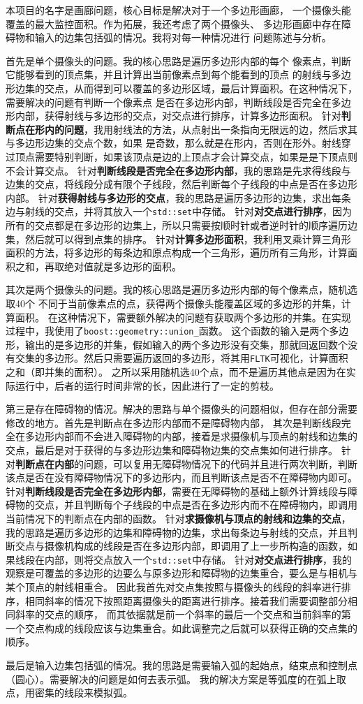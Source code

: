 本项目的名字是画廊问题，核心目标是解决对于一个多边形画廊，
一个摄像头能覆盖的最大监控面积。作为拓展，我还考虑了两个摄像头、
多边形画廊中存在障碍物和输入的边集包括弧的情况。我将对每一种情况进行
问题陈述与分析。

首先是单个摄像头的问题。我的核心思路是遍历多边形内部的每个
像素点，判断它能够看到的顶点集，并且计算出当前像素点到每个能看到的顶点
的射线与多边形边集的交点，从而得到可以覆盖的多边形区域，最后计算面积。在这种情况下，需要解决的问题有判断一个像素点
是否在多边形内部，判断线段是否完全在多边形内部，获得射线与多边形的交点，对交点进行排序，计算多边形面积。
针对\textbf{判断点在形内的问题}，我用射线法的方法，从点射出一条指向无限远的边，然后求其与多边形边集的交点个数，如果
是奇数，那么就是在形内，否则在形外。射线穿过顶点需要特别判断，如果该顶点是边的上顶点才会计算交点，如果是是下顶点则不会计算交点。
针对\textbf{判断线段是否完全在多边形内部}，我的思路是先求得线段与边集的交点，将线段分成有限个子线段，然后判断每个子线段的中点是否在多边形内部。
针对\textbf{获得射线与多边形的交点}，我的思路是遍历多边形的边集，求出每条边与射线的交点，并将其放入一个\texttt{std::set}中存储。
针对\textbf{对交点进行排序}，因为所有的交点都是在多边形的边集上，所以只需要按顺时针或者逆时针的顺序遍历边集，然后就可以得到点集的排序。
针对\textbf{计算多边形面积}，我利用叉乘计算三角形面积的方法，将多边形的每条边和原点构成一个三角形，遍历所有三角形，计算面积之和，再取绝对值就是多边形的面积。

其次是两个摄像头的问题。我的核心思路是遍历多边形内部的每个像素点，随机选取40个
不同于当前像素点的点，获得两个摄像头能覆盖区域的多边形的并集，计算面积。
在这种情况下，需要额外解决的问题有获取两个多边形的并集。在实现过程中，我使用了\texttt{boost::geometry::union_}函数。
这个函数的输入是两个多边形，输出的是多边形的并集，假如输入的两个多边形没有交集，那就回返回数个没有交集的多边形。然后只需要遍历返回的多边形，将其用\texttt{FLTK}可视化，计算面积之和（即并集的面积）。
之所以采用随机选40个点，而不是遍历其他点是因为在实际运行中，后者的运行时间非常的长，因此进行了一定的剪枝。

第三是存在障碍物的情况。解决的思路与单个摄像头的问题相似，但存在部分需要修改的地方。首先是判断点在多边形内部而不是障碍物内部，
其次是判断线段完全在多边形内部而不会进入障碍物的内部，接着是求摄像机与顶点的射线和边集的交点，最后是对于获得的与多边形边集和障碍物边集的交点集如何进行排序。
针对\textbf{判断点在内部}的问题，可以复用无障碍物情况下的代码并且进行两次判断，判断该点是否在没有障碍物情况下的多边形内，而且判断该点是否不在障碍物内即可。
针对\textbf{判断线段是否完全在多边形内部}，需要在无障碍物的基础上额外计算线段与障碍物的交点，并且判断每个子线段的中点是否在多边形内而不在障碍物内，即调用当前情况下的判断点在内部的函数。
针对\textbf{求摄像机与顶点的射线和边集的交点}，我的思路是遍历多边形的边集和障碍物的边集，求出每条边与射线的交点，并且判断交点与摄像机构成的线段是否在多边形内部，即调用了上一步所构造的函数，如果线段在内部，则将交点放入一个\texttt{std::set}中存储。
针对\textbf{对交点进行排序}，我的观察是可覆盖的多边形的边要么与原多边形和障碍物的边集重合，要么是与相机与某个顶点的射线相重合。
因此我首先对交点集按照与摄像头的线段的斜率进行排序，相同斜率的情况下按照距离摄像头的距离进行排序。接着我们需要调整部分相同斜率的交点的顺序，
而其依据就是前一个斜率的最后一个交点和当前斜率的第一个交点构成的线段应该与边集重合。如此调整完之后就可以获得正确的交点集的顺序。

最后是输入边集包括弧的情况。我的思路是需要输入弧的起始点，结束点和控制点（圆心）。需要解决的问题是如何去表示弧。
我的解决方案是等弧度的在弧上取点，用密集的线段来模拟弧。
